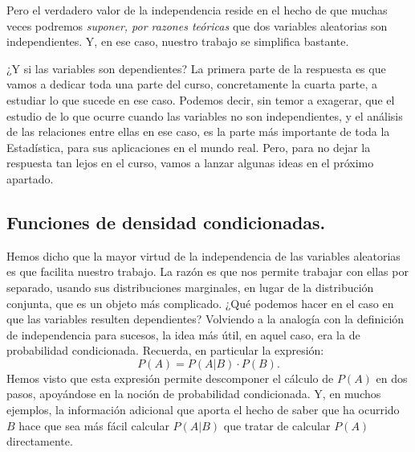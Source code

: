Pero el verdadero valor de la independencia reside en el hecho de que muchas veces podremos {\em suponer, por razones teóricas} que dos variables aleatorias son independientes. Y, en ese caso, nuestro trabajo se simplifica bastante.

¿Y si las variables son dependientes? La primera parte de la respuesta es que vamos a dedicar toda una parte del curso, concretamente la cuarta parte, a estudiar lo que sucede en ese caso. Podemos decir, sin temor a exagerar, que el estudio de lo que ocurre cuando las variables no son independientes, y el análisis de las relaciones entre ellas en ese caso, es la parte más importante de toda la Estadística, para sus aplicaciones en el mundo real. Pero, para no dejar la respuesta tan lejos en el curso, vamos a lanzar algunas ideas en el próximo apartado.

\subsection{Funciones de densidad condicionadas.}
\label{cap04:subsec:FuncionesDensidadCondicionadasVectorAleatorio}

Hemos dicho que la mayor virtud de la independencia de las variables aleatorias es que facilita  nuestro trabajo. La razón es que nos permite trabajar con ellas por separado, usando sus distribuciones marginales, en lugar de la distribución conjunta, que es un objeto más complicado.
¿Qué podemos hacer en el caso en que las variables resulten dependientes? Volviendo a la analogía con la definición de independencia para sucesos, la idea más útil, en aquel caso, era la de probabilidad condicionada. Recuerda, en particular la expresión:
\[P(A) = P(A|B)\cdot P(B).\]
Hemos visto que esta expresión permite descomponer el cálculo de $P(A)$ en dos pasos, apoyándose en la noción de probabilidad condicionada. Y, en muchos ejemplos, la información adicional que aporta el hecho de saber que ha ocurrido $B$ hace que sea más fácil calcular $P(A|B)$ que tratar de calcular $P(A)$ directamente.

